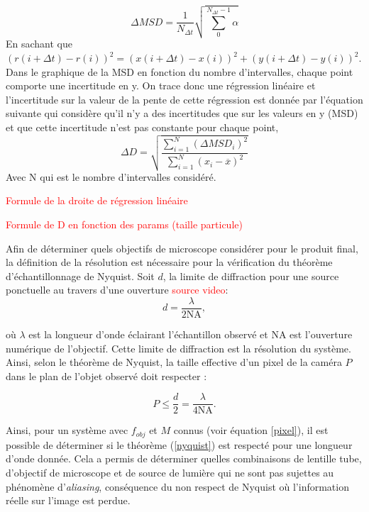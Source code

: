 \documentclass[conference]{IEEEtran}
\begin{document}
\begin{equation}
  \Delta MSD=\frac{1}{N_{\Delta t}}\sqrt{\sum_{0}^{N_{\Delta t}-1}\alpha }
\end{equation}
En sachant que $\left ( r(i+\Delta t)-r(i) \right )^{2}=\left ( x(i+\Delta t)-x(i) \right )^{2}+\left ( y(i+\Delta t)-y(i) \right )^{2}$.
Dans le graphique de la MSD en fonction du nombre d'intervalles, chaque point comporte une incertitude en y. On 
trace donc une régression linéaire et l'incertitude sur la valeur de la pente de cette régression est donnée par l'équation suivante
qui considère qu'il n'y a des incertitudes que sur les valeurs en y (MSD) et que cette incertitude n'est pas constante pour chaque point, 
\begin{equation}
  \Delta D=\sqrt{\frac{\sum_{i=1}^{N}(\Delta MSD_{i})^{2}}{\sum_{i=1}^{N}{(x_{i}-\overline{x})^{2}}}}
\end{equation}
Avec N qui est le nombre d'intervalles considéré. 

\textcolor{red}{Formule de la droite de régression linéaire}

\textcolor{red}{Formule de D en fonction des params (taille particule)}

Afin de déterminer quels objectifs de microscope considérer pour le produit final, la définition
de la résolution est nécessaire pour la vérification du théorème d'échantillonnage de Nyquist. Soit $d$,
la limite de diffraction pour une source ponctuelle au travers d'une ouverture \textcolor{red}{source video}:
\begin{equation}
  d = \frac{\lambda}{2 \text{NA}},
\end{equation}

où $\lambda$ est la longueur d'onde éclairant l'échantillon observé et NA est l'ouverture numérique de
l'objectif. Cette limite de diffraction est la résolution du système. Ainsi, selon le théorème
de Nyquist, la taille effective d'un pixel de la caméra $P$ dans le plan de l'objet observé doit respecter :

\begin{equation}\label{nyquist}
  P \leq \frac{d}{2} = \frac{\lambda}{4 \text{NA} }.
\end{equation}


Ainsi, pour un système avec $f_{obj}$ et $M$ connus (voir équation \ref{pixel}), il est possible de déterminer si le théorème 
(\ref{nyquist}) est respecté pour une longueur d'onde donnée. Cela a permis de déterminer quelles 
combinaisons de lentille tube, d'objectif de microscope et de source de lumière qui ne sont pas 
sujettes au phénomène d'\textit{aliasing}, conséquence du non respect de Nyquist où l'information
réelle sur l'image est perdue.
\end{document}
